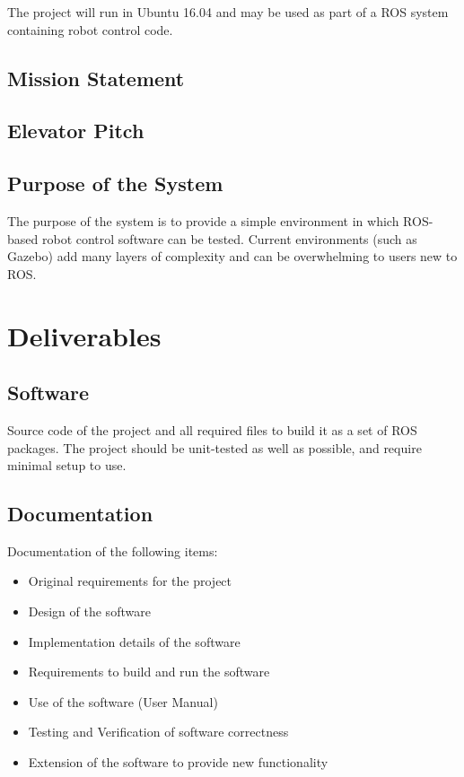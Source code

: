 The project will run in Ubuntu 16.04 and may be used as part of a ROS system containing robot control code.

\subsection{Mission Statement}

\subsection{Elevator Pitch}

\subsection{Purpose of the System}
The purpose of the system is to provide a simple environment in which ROS-based robot control software can be tested. Current environments (such as Gazebo) add many layers of complexity and can be overwhelming to users new to ROS.

\section{Deliverables}

\subsection{Software}
Source code of the project and all required files to build it as a set of ROS packages. The project should be unit-tested as well as possible, and require minimal setup to use. 

\subsection{Documentation}
Documentation of the following items:
\begin{itemize}
	\item Original requirements for the project
	\item Design of the software
	\item Implementation details of the software
	\item Requirements to build and run the software
	\item Use of the software (User Manual)
	\item Testing and Verification of software correctness
	\item Extension of the software to provide new functionality
\end{itemize}
